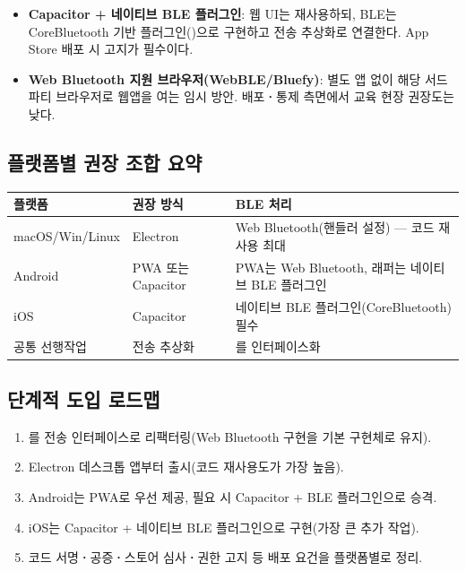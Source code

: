 \begin{itemize}
  \item \textbf{Capacitor + 네이티브 BLE 플러그인}: 웹 UI는 재사용하되, BLE는
        CoreBluetooth 기반 플러그인()으로
        구현하고 전송 추상화로 연결한다. App Store 배포 시
         고지가 필수이다.
  \item \textbf{Web Bluetooth 지원 브라우저(WebBLE/Bluefy)}: 별도 앱 없이
        해당 서드파티 브라우저로 웹앱을 여는 임시 방안. 배포\textbf{·}통제 측면에서
        교육 현장 권장도는 낮다.
\end{itemize}

\subsection{플랫폼별 권장 조합 요약}

\begin{longtable}{L{2.8cm} L{3.6cm} L{7.6cm}}
\toprule
{}\textbf{플랫폼} & \textbf{권장 방식} & \textbf{BLE 처리} \\
\midrule
\endhead
macOS/Win/Linux & Electron & Web Bluetooth(핸들러 설정) --- 코드 재사용 최대 \\
Android & PWA 또는 Capacitor & PWA는 Web Bluetooth, 래퍼는 네이티브 BLE 플러그인 \\
iOS & Capacitor & 네이티브 BLE 플러그인(CoreBluetooth) 필수 \\
공통 선행작업 & 전송 추상화 & 를 인터페이스화 \\
\bottomrule
\end{longtable}

\subsection{단계적 도입 로드맵}

\begin{enumerate}
  \item {}를 전송 인터페이스로 리팩터링(Web Bluetooth 구현을
        기본 구현체로 유지).
  \item Electron 데스크톱 앱부터 출시(코드 재사용도가 가장 높음).
  \item Android는 PWA로 우선 제공, 필요 시 Capacitor + BLE 플러그인으로 승격.
  \item iOS는 Capacitor + 네이티브 BLE 플러그인으로 구현(가장 큰 추가 작업).
  \item 코드 서명\textbf{·}공증\textbf{·}스토어 심사\textbf{·}권한 고지 등 배포 요건을
        플랫폼별로 정리.
\end{enumerate}

